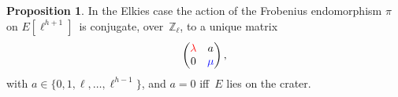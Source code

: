 \documentclass[10pt,a4paper]{beamer}
\theoremstyle{plain}
\theoremstyle{definition}
\theoremstyle{definition}
\theoremstyle{definition}
\newtheorem{prop}[thm]{Proposition}
\theoremstyle{definition}
\theoremstyle{remark}
\theoremstyle{remark}
\begin{document}
%


\begin{frame}

\begin{prop}\label{prop:matrice-Frobenius}
In the Elkies case the action of the Frobenius endomorphism $\pi$ on $E[\ell^{h+1}]$~is conjugate, over~$\mathbb{Z}_{\ell}$,
to a unique matrix \[\left ( \begin{matrix}{\color{red}\lambda} & a\\ 0 & {\color{blue}\mu} \end{matrix}\right ), \]  with $a \in \{ 0,1,\ell, \dots, \ell^{h-1}  \}$, and $a = 0$ iff~$E$ lies on the crater.

\end{prop}%

\begin{figure}
\begin{center}


\end{center}
\end{figure}
\end{frame}
\end{document}
